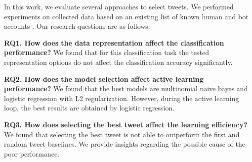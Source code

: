 In this work, we evaluate several approaches to select tweets. We performed experiments on collected data based on an existing list of known human and bot accounts \citep{lee:aaai11}. Our research questions are as follows:

\textbf{RQ1. How does the data representation affect the classification performance?}
We found that for this classification task the tested representation options do not affect the classification accuracy significantly. 

\textbf{RQ2. How does the model selection affect active learning performance?}
We found that the best models are multinomial naive bayes and logistic regression with L2 regularization. However, during the active learning loop, the best results are obtained by logistic regression.

\textbf{RQ3. How does selecting the best tweet affect the learning efficiency?}
We found that selecting the best tweet is not able to outperform the first and random tweet baselines. We provide insights regarding the possible cause of the poor performance. 